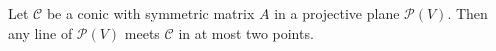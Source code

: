 Let $\mathcal{C}$ be a conic with symmetric matrix $A$ in a projective plane $\mathcal{P}(V)$. Then any line of $\mathcal{P}(V)$ meets $\mathcal{C}$ in at most two points.
